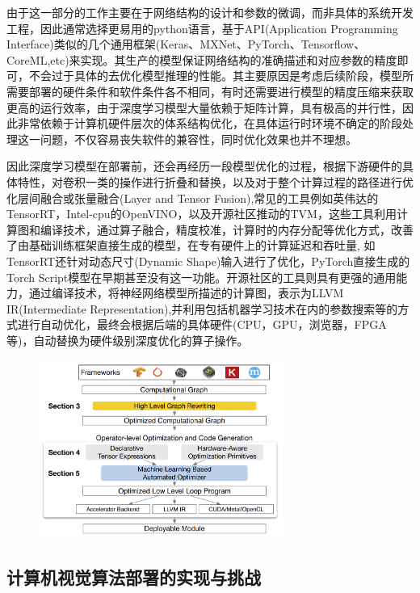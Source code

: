 \documentclass[master]{shtthesis}
\begin{document}
由于这一部分的工作主要在于网络结构的设计和参数的微调，而非具体的系统开发工程，因此通常选择更易用的python语言，基于API(Application Programming Interface)类似的几个通用框架(Keras、MXNet、PyTorch、Tensorflow、CoreML,etc)来实现。其生产的模型保证网络结构的准确描述和对应参数的精度即可，不会过于具体的去优化模型推理的性能。其主要原因是考虑后续阶段，模型所需要部署的硬件条件和软件条件各不相同，有时还需要进行模型的精度压缩来获取更高的运行效率，由于深度学习模型大量依赖于矩阵计算，具有极高的并行性，因此非常依赖于计算机硬件层次的体系结构优化，在具体运行时环境不确定的阶段处理这一问题，不仅容易丧失软件的兼容性，同时优化效果也并不理想。

因此深度学习模型在部署前，还会再经历一段模型优化的过程，根据下游硬件的具体特性，对卷积一类的操作进行折叠和替换，以及对于整个计算过程的路径进行优化层间融合或张量融合(Layer and Tensor Fusion),常见的工具例如英伟达的TensorRT，Intel-cpu的OpenVINO，以及开源社区推动的TVM\cite{DBLP:journals/corr/abs-1802-04799}，这些工具利用计算图和编译技术，通过算子融合，精度校准，计算时的内存分配等优化方式，改善了由基础训练框架直接生成的模型，在专有硬件上的计算延迟和吞吐量, 如TensorRT还针对动态尺寸(Dynamic Shape)输入进行了优化，PyTorch直接生成的Torch Script模型\cite{paszke2019pytorch}在早期甚至没有这一功能。开源社区的工具则具有更强的通用能力，通过编译技术，将神经网络模型所描述的计算图，表示为LLVM IR(Intermediate Representation)\cite{lattner2004llvm},并利用包括机器学习技术在内的参数搜索等的方式进行自动优化，最终会根据后端的具体硬件(CPU，GPU，浏览器，FPGA等)，自动替换为硬件级别深度优化的算子操作。

\begin{figure}[htbp]
	\centering
	\includegraphics[width=8cm]{img/3.png}
	\label{TVM架构图}
\end{figure}


\subsection{计算机视觉算法部署的实现与挑战}\label{计算机视觉算法部署的实现与挑战}
\end{document}
